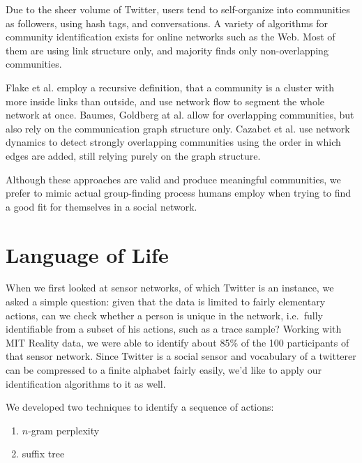 \documentclass[10pt,oneside]{memoir}
\begin{document}
Due to the sheer volume of Twitter, users tend to self-organize into communities as followers, using hash tags, and conversations.  A variety of algorithms for community identification exists for online networks such as the Web.  Most of them are using link structure only, and majority finds only non-overlapping communities.


Flake et al. \cite{Flake:2002:Communities} employ a recursive definition, that a community is a cluster with more inside links than outside, and use network flow to segment the whole network at once.  Baumes, Goldberg at al. \cite{Baumes:2010:Overlapping, Goldberg:2010:OverlappingClusters} allow for overlapping communities, but also rely on the communication graph structure only.  Cazabet et al. \cite{Cazabet:2010:Communities} use network dynamics to detect strongly overlapping communities using the order in which edges are added, still relying purely on the graph structure.


Although these approaches are valid and produce meaningful communities, we prefer to mimic actual group-finding process humans employ when trying to find a good fit for themselves in a social network.


\pagebreak \section{Language of Life}
\label{languageoflife}

When we first looked at sensor networks, of which Twitter is an instance, we asked a simple question: given that the data is limited to fairly elementary actions, can we check whether a person is unique in the network, i.e.\ fully identifiable from a subset of his actions, such as a trace sample?  Working with MIT Reality data, we were able to identify about 85\% of the 100 participants of that sensor network.  Since Twitter is a social sensor and vocabulary of a twitterer can be compressed to a finite alphabet fairly easily, we'd like to apply our identification algorithms to it as well.


We developed two techniques to identify a sequence of actions:


\begin{enumerate}


\item $n$-gram perplexity

\item suffix tree
\end{enumerate}
\end{document}
